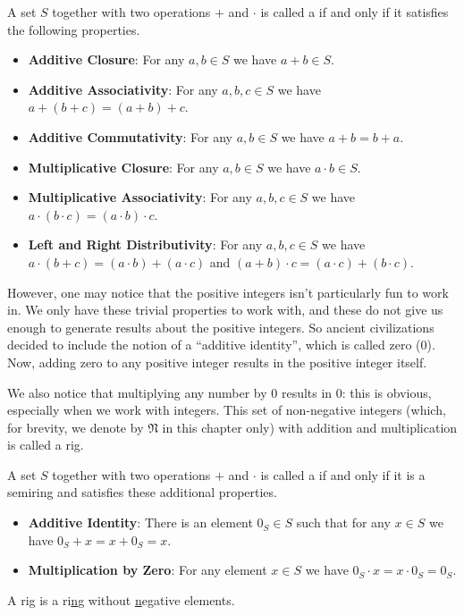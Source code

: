 \begin{definition}
    A set $S$ together with two operations $+$ and $\cdot$ is called a  if and only if it satisfies the following properties.
    \begin{itemize}
        \item \textbf{Additive Closure}: For any $a, b \in S$ we have $a + b \in S$.
        \item \textbf{Additive Associativity}: For any $a, b, c \in S$ we have $a+(b+c) = (a+b)+c$.
        \item \textbf{Additive Commutativity}: For any $a, b \in S$ we have $a + b = b + a$.
        \item \textbf{Multiplicative Closure}: For any $a, b \in S$ we have $a \cdot b \in S$.
        \item \textbf{Multiplicative Associativity}: For any $a, b, c \in S$ we have $a\cdot(b\cdot c) = (a\cdot b)\cdot c$.
        \item \textbf{Left and Right Distributivity}: For any $a, b, c \in S$ we have $a\cdot(b + c) = (a \cdot b) + (a \cdot c)$ and $(a + b) \cdot c = (a \cdot c) + (b \cdot c)$.
    \end{itemize}
\end{definition}

However, one may notice that the positive integers isn't particularly fun to work in. We only have these trivial properties to work with, and these do not give us enough to generate results about the positive integers. So ancient civilizations decided to include the notion of a ``additive identity'', which is called zero (0). Now, adding zero to any positive integer results in the positive integer itself.

We also notice that multiplying any number by 0 results in 0: this is obvious, especially when we work with integers. This set of non-negative integers (which, for brevity, we denote by $\mathfrak{N}$ in this chapter only) with addition and multiplication is called a rig.
\begin{definition}
    A set $S$ together with two operations $+$ and $\cdot$ is called a  if and only if it is a semiring and satisfies these additional properties.
    \begin{itemize}
        \item \textbf{Additive Identity}: There is an element $0_S \in S$ such that for any $x \in S$ we have $0_S + x = x + 0_S = x$.
        \item \textbf{Multiplication by Zero}: For any element $x \in S$ we have $0_S \cdot x = x \cdot 0_S = 0_S$.
    \end{itemize}
\end{definition}
\begin{remark}
    A rig is a ri\underline{n}g without \underline{n}egative elements.
\end{remark}

